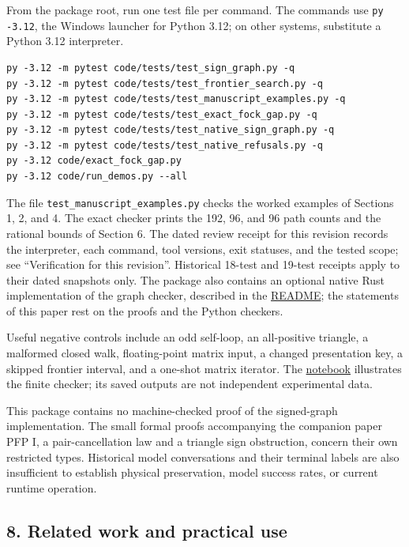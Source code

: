 \documentclass[
  11pt,
]{article}
\newcommand{\passthrough}[1]{#1}
\begin{document}
From the package root, run one test file per command. The commands use
\passthrough{\lstinline!py -3.12!}, the Windows launcher for Python
3.12; on other systems, substitute a Python 3.12 interpreter.

\begin{lstlisting}
py -3.12 -m pytest code/tests/test_sign_graph.py -q
py -3.12 -m pytest code/tests/test_frontier_search.py -q
py -3.12 -m pytest code/tests/test_manuscript_examples.py -q
py -3.12 -m pytest code/tests/test_exact_fock_gap.py -q
py -3.12 -m pytest code/tests/test_native_sign_graph.py -q
py -3.12 -m pytest code/tests/test_native_refusals.py -q
py -3.12 code/exact_fock_gap.py
py -3.12 code/run_demos.py --all
\end{lstlisting}

The file \nolinkurl{test_manuscript_examples.py} checks the worked
examples of Sections 1, 2, and 4. The exact checker prints the 192, 96,
and 96 path counts and the rational bounds of Section 6. The dated
review receipt for this revision records the interpreter, each command,
tool versions, exit statuses, and the tested scope; see ``Verification
for this revision''. Historical 18-test and 19-test receipts apply to
their dated snapshots only. The package also contains an optional native
Rust implementation of the graph checker, described in the
\href{README.md}{README}; the statements of this paper rest on the
proofs and the Python checkers.

Useful negative controls include an odd self-loop, an all-positive
triangle, a malformed closed walk, floating-point matrix input, a
changed presentation key, a skipped frontier interval, and a one-shot
matrix iterator. The
\href{https://github.com/dbccpage/the_symbol_game/blob/c819bec432446dd3c9b1edf1583384cfe76c6c71/atlas/coda_atlas/symbol_game/002_pfp_signed_presentations_and_search_frontier/jupyter_notebooks/signed_exchange_and_frontier.ipynb}{notebook}
illustrates the finite checker; its saved outputs are not independent
experimental data.

This package contains no machine-checked proof of the signed-graph
implementation. The small formal proofs accompanying the companion paper
PFP I, a pair-cancellation law and a triangle sign obstruction, concern
their own restricted types. Historical model conversations and their
terminal labels are also insufficient to establish physical
preservation, model success rates, or current runtime operation.

\subsection{8. Related work and practical
use}\label{related-work-and-practical-use}
\end{document}
